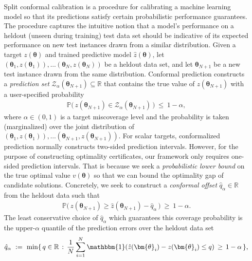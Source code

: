 \documentclass[10pt]{article} %
\theoremstyle{plain}
\theoremstyle{definition}
\theoremstyle{remark}
\begin{document}
Split conformal calibration \citep{vovk2005algorithmic, lei2018distribution} is a procedure for calibrating a machine learning model so that its predictions satisfy certain probabilistic performance guarantees.
The procedure captures the intuitive notion that a model's performance on a heldout (unseen during training) test data set should be indicative of its expected performance on new test instances drawn from a similar distribution.
Given a target $z(\bm{\theta})$ and trained predictive model $\hat{z}(\bm{\theta})$, let 
$(\bm{\theta}_1, z(\bm{\theta}_1)), \dots (\bm{\theta}_N, z(\bm{\theta}_N))$
be a heldout data set, and let $\bm{\theta}_{N+1}$ be a new test instance drawn from the same distribution.
Conformal prediction constructs a \textit{prediction set} $\mathcal{Z}_\alpha(\bm{\theta}_{N+1}) \subseteq \mathbb{R}$ that contains the true value of $z(\bm{\theta}_{N+1})$ with a user-specified probability
\begin{align*}
    \mathbb{P}\big( \, z(\bm{\theta}_{N+1}) \in \mathcal{Z}_\alpha(\bm{\theta}_{N+1}) \,\big) ~\leq~ 1 - \alpha,
\end{align*}
where $\alpha \in (0, 1)$ is a target miscoverage level and the probability is taken (marginalized) over the joint distribution of 
$(\bm{\theta}_1, z(\bm{\theta}_1)), \dots (\bm{\theta}_{N+1}, z(\bm{\theta}_{N+1}))$.
For scalar targets, conformalized prediction normally constructs two-sided prediction intervals. However, for the purpose of constructing optimality certificates, our framework only requires one-sided prediction intervals.
That is because we seek a \textit{probabilistic lower bound} on the true optimal value $v(\bm{\theta})$ so that we can bound the optimality gap of candidate solutions. 
Concretely, we seek to construct a \textit{conformal offset} $\hat{q}_\alpha \in \mathbb{R}$ from the heldout data such that
\begin{align*}
    \mathbb{P}\big( \, z(\bm{\theta}_{N+1}) \geq \hat{z}(\bm{\theta}_{N+1}) - \hat{q}_\alpha \, \big) ~\geq~ 1 - \alpha.
\end{align*}
The least conservative choice of $\hat{q}_\alpha$ which guarantees this coverage probability is the upper-$\alpha$ quantile of the prediction errors over the heldout data set
\begin{align*}
    \hat{q}_\alpha ~:=~ \min \{\, q \in \mathbb{R} \, : \, \frac{1}{N} \sum_{i=1}^{N} \mathbbm{1}(\hat{z}(\bm{\theta}_i) - z(\bm{\theta}_i) \leq q) \,\geq\, 1 - \alpha \, \},
\end{align*}
\end{document}
